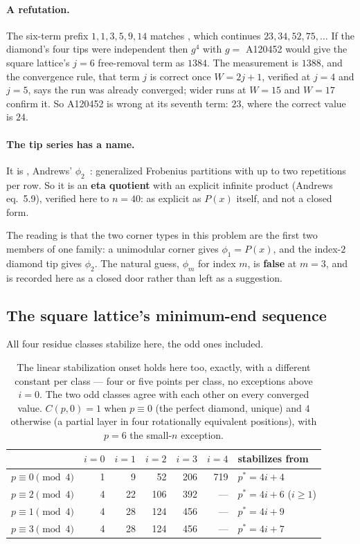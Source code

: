 \documentclass[11pt]{article}
\begin{document}
\paragraph{A refutation.} The six-term prefix
$1,1,3,5,9,14$ matches , which continues $23, 34, 52, 75,\dots$
If the diamond's four tips were independent then $g^4$ with $g = $ A120452 would
give the square lattice's $j = 6$ free-removal term as $1384$. The measurement is
$1388$, and the convergence rule, that term $j$ is correct once $W = 2j+1$,
verified at $j = 4$ and $j = 5$, says the run was already converged; wider runs
at $W = 15$ and $W = 17$ confirm it. So A120452 is wrong at its seventh term:
$23$, where the correct value is $24$.

\paragraph{The tip series has a name.} It is , Andrews'
$\phi_2$~\cite{andrews1984}: generalized Frobenius partitions with up to two
repetitions per row. So it is an \textbf{eta quotient} with an explicit infinite product (Andrews
eq.~5.9), verified here to $n = 40$: as explicit as $P(x)$ itself, and not a
closed form.

The reading is that the two corner types in this problem are the first two
members of one family: a unimodular corner gives $\phi_1 = P(x)$, and the
index-$2$ diamond tip gives $\phi_2$. The natural guess, $\phi_m$ for index
$m$, is \textbf{false} at $m = 3$, and is recorded here as a closed door rather
than left as a suggestion.

\subsection{The square lattice's minimum-end sequence}

All four residue classes stabilize here, the odd ones included.

\begin{table}[H]
\centering\small
\begin{tabular}{l r r r r r l}
\toprule
 & $i=0$ & $i=1$ & $i=2$ & $i=3$ & $i=4$ & stabilizes from \\
\midrule
$p \equiv 0 \pmod 4$ & 1 & 9  & 52  & 206 & 719 & $p^\ast = 4i+4$ \\
$p \equiv 2 \pmod 4$ & 4 & 22 & 106 & 392 & --- & $p^\ast = 4i+6$ ($i\ge1$) \\
$p \equiv 1 \pmod 4$ & 4 & 28 & 124 & 456 & --- & $p^\ast = 4i+9$ \\
$p \equiv 3 \pmod 4$ & 4 & 28 & 124 & 456 & --- & $p^\ast = 4i+7$ \\
\bottomrule
\end{tabular}
\caption{The linear stabilization onset holds here too, exactly, with a
different constant per class --- four or five points per class, no exceptions
above $i = 0$. The two odd classes agree with each other on every converged
value. $C(p,0) = 1$ when $p \equiv 0$ (the perfect diamond, unique) and $4$
otherwise (a partial layer in four rotationally equivalent positions), with
$p = 6$ the small-$n$ exception.}
\label{tab:sq4min}
\end{table}
\end{document}
